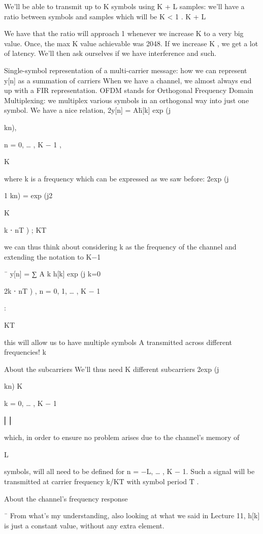 {We'll be able to transmit up to K symbols using K + L samples: we'll have a ratio between symbols and samples which will be K
< 1 .
K + L

We have that the ratio will approach 1 whenever we increase K to a very big value.
Once, the max K value achievable was 2048.
If we increase K , we get a lot of latency.
We'll then ask ourselves if we have interference and such.

Single-symbol representation of a multi-carrier message: how we can represent y[n] as a summation of carriers When we have a channel, we almost always end up with a FIR representation.
OFDM stands for Orthogonal Frequency Domain Multiplexing: we multiplex various symbols in an orthogonal way into just one symbol.
We have a nice relation,
2\pi y[n] = Ah̄[k] exp (j

kn),

n = 0, … , K − 1 ,

K

where k is a frequency which can be expressed as we saw before:
2\pi exp (j

1 kn) = exp (j2\pi

K

k ⋅ nT ) ;
KT

we can thus think about considering k as the frequency of the channel and extending the notation to K−1

¯
y[n] = ∑ A k h[k] exp (j k=0

2\pi k ⋅ nT ) , n = 0, 1, … , K − 1

:

KT

this will allow us to have multiple symbols A transmitted across different frequencies!
k

About the subcarriers We'll thus need K different subcarriers 2\pi exp (j

kn)
K

k = 0, … , K − 1

⎢⎥

which, in order to ensure no problem arises due to the channel's memory of

L

symbols, will all need to be defined for n = −L, … , K − 1.
Such a signal will be transmitted at carrier frequency k/KT with symbol period T .

About the channel's frequency response

¯
From what's my understanding, also looking at what we said in Lecture 11, h[k]
is just a constant value, without any extra element.

}
